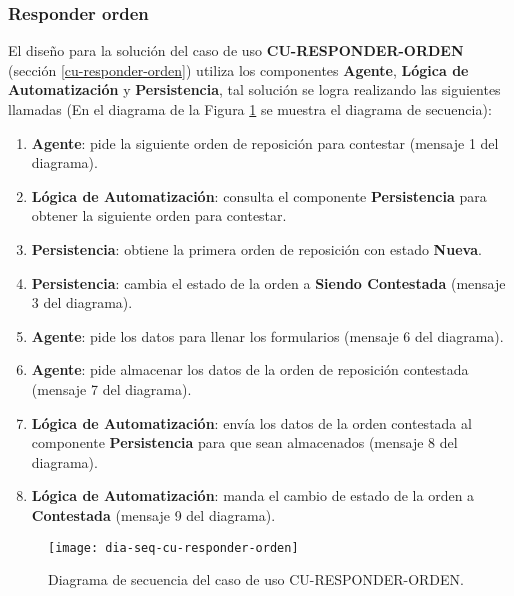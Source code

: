 \subsubsection{Responder orden}
El diseño para la solución del caso de uso \textbf{CU-RESPONDER-ORDEN} (sección \ref{cu-responder-orden}) utiliza los componentes \textbf{Agente}, \textbf{Lógica de Automatización} y \textbf{Persistencia}, tal solución se logra realizando las siguientes llamadas (En el diagrama de la Figura \ref{fig:dia-seq-cu-responder-orden} se muestra el diagrama de secuencia):
\begin{enumerate}
	\item \textbf{Agente}: pide la siguiente orden de reposición para contestar (mensaje 1 del diagrama).
	\item \textbf{Lógica de Automatización}: consulta el componente \textbf{Persistencia} para obtener la siguiente orden para contestar.
	\item \textbf{Persistencia}: obtiene la primera orden de reposición con estado \textbf{Nueva}.
	\item \textbf{Persistencia}: cambia el estado de la orden a \textbf{Siendo Contestada} (mensaje 3 del diagrama).
	\item \textbf{Agente}: pide los datos para llenar los formularios (mensaje 6 del diagrama).
	\item \textbf{Agente}: pide almacenar los datos de la orden de reposición contestada (mensaje 7 del diagrama).
	\item \textbf{Lógica de Automatización}: envía los datos de la orden contestada al componente \textbf{Persistencia} para que sean almacenados (mensaje 8 del diagrama).
	\item \textbf{Lógica de Automatización}: manda el cambio de estado de la orden a \textbf{Contestada} (mensaje 9 del diagrama).
\end{enumerate}

\begin{figure}[h]
	\centering
	\texttt{[image: dia-seq-cu-responder-orden]}
	\caption{Diagrama de secuencia del caso de uso CU-RESPONDER-ORDEN.}
	\label{fig:dia-seq-cu-responder-orden}
\end{figure}

